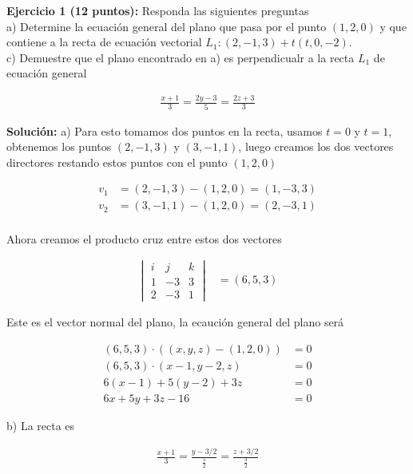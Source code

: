 \documentclass[a4paper]{article}
\begin{document}
\setlength{\parindent}{0cm}

\textbf{Ejercicio 1 \textbf{(12 puntos)}:} Responda las siguientes preguntas \\


a) Determine la ecuación general del plano que pasa por el punto $(1,2,0)$ y que contiene a la recta de ecuación vectorial $L_1: (2,-1,3)+t(t,0,-2)$. \\

 

c) Demuestre que el plano  encontrado en a) es perpendicualr a la recta $L_1$ de ecuación general 

\begin{align*}
    \frac{x+1}{3} = \frac{2y-3}{5} =\frac{2z+3}{3}
\end{align*}


\textbf{Solución: }a) Para esto tomamos dos puntos en la recta, usamos $t=0$ y $t=1$, obtenemos los puntos $(2,-1,3)$ y $(3,-1,1)$, luego creamos los dos vectores directores restando estos puntos con el punto $(1,2,0)$

\begin{align*}
    v_1 &= (2,-1,3)- (1,2,0) = (1,-3,3)\\
    v_2 &= (3,-1,1)- (1,2,0) = (2,-3,1)\\
\end{align*}

Ahora creamos el producto cruz entre estos dos vectores

\begin{align*}
    \begin{vmatrix}
        i & j & k \\
        1 & -3 & 3 \\
        2 & -3 & 1 
    \end{vmatrix} &= (6,5,3)
\end{align*}

Este es el vector normal del plano, la ecaución general del plano será

\begin{align*}
    (6,5,3) \cdot ((x,y,z)-(1,2,0)) &=0  \\
    (6,5,3) \cdot (x-1,y-2,z) &=0 \\
    6(x-1)+5(y-2)+3z &=0 \\
    6x+5y+3z-16 &=0
\end{align*}


b) La recta es


\begin{align*}
    \frac{x+1}{3} = \frac{y-3/2}{\frac{5}{2}}=\frac{z+3/2}{\frac{3}{2}}
\end{align*}
\end{document}
